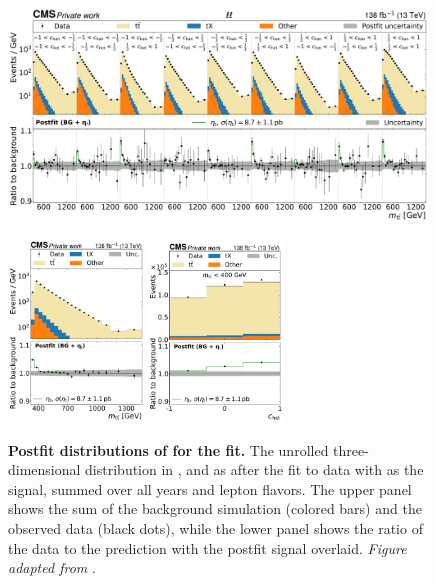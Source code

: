 \begin{figure}[p]
    \centering
    \includegraphics[width=0.99\textwidth]{figures/ah/prepost/EtaT_fit_s_ll_run2_both.pdf}
    \caption{
        \label{fig:ah:postfit_etat_ll}
        \textbf{Postfit distributions of \mttchelchan for the \etat fit.} The unrolled three-dimensional distribution in \mtt, \chel and \chan as after the fit to data with \etat as the signal, summed over all years and lepton flavors. The upper panel shows the sum of the background simulation (colored bars) and the observed data (black dots), while the lower panel shows the ratio of the data to the prediction with the postfit \etat signal overlaid. \textit{Figure adapted from }.
    }
    \vspace{1cm}  
    \includegraphics[width=0.32\textwidth]{figures/ah/prepost/EtaT_fit_s_ll_run2_both_mtt.pdf}
    \hfill
    \includegraphics[width=0.32\textwidth]{figures/ah/prepost/EtaT_fit_s_ll_run2_both_chel_mttlt400.pdf}

\end{figure}
